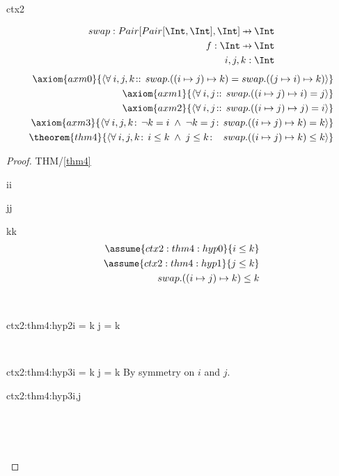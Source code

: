 \documentclass[12pt]{amsart}
\begin{document}
\begin{context}{ctx2}

\begin{align*}
\constant{swap : Pair [Pair [ \Int, \Int ], \Int ] \pfun \Int } \\
\dummy{ f : \Int \pfun \Int } \\
\dummy{ i,j,k : \Int } 
\end{align*}
\begin{align*}
\axiom{axm0}{ \qforall{i,j,k}{}{ swap.((i \mapsto j) \mapsto k) = swap.((j \mapsto i) \mapsto k) } } \\
\axiom{axm1}{ \qforall{i,j}{}{ swap.((i \mapsto j) \mapsto i) = j } } \\
\axiom{axm2}{ \qforall{i,j}{}{ swap.((i \mapsto j) \mapsto j) = i } } \\
\axiom{axm3}{ \qforall{i,j,k}{\neg k = i \1\land \neg k = j}{ swap.((i \mapsto j) \mapsto k) = k } } \\
\theorem{thm4}{ \qforall{i,j,k}{i \le k \1\land j \le k}{  ~ ~ swap.((i \mapsto j) \mapsto k) \le k } } \\
\end{align*}

\begin{proof}{THM/\ref{thm4}}
\begin{free:var}{i}{i}
\begin{free:var}{j}{j}
\begin{free:var}{k}{k}
	\begin{align}
	\assume{ctx2:thm4:hyp0}{i \le k} \\
	\assume{ctx2:thm4:hyp1}{j \le k} \\
	\goal{ swap.((i \mapsto j) \mapsto k) \le k }
	\end{align}
	\noindent
	\begin{by:cases} \\
	\begin{case}{ctx2:thm4:hyp2}{\neg i = k \land \neg j = k}
		\easy
	\end{case} \\
	\begin{case}{ctx2:thm4:hyp3}{i = k \lor j = k}
		By symmetry on $i$ and $j$.
		\begin{by:symmetry}{ctx2:thm4:hyp3}{i,j}
		\easy
		\end{by:symmetry} \\
	\noindent \end{case} \\
	\end{by:cases}
\end{free:var}
\end{free:var}
\end{free:var}
\end{proof}

\end{context}
\end{document}
